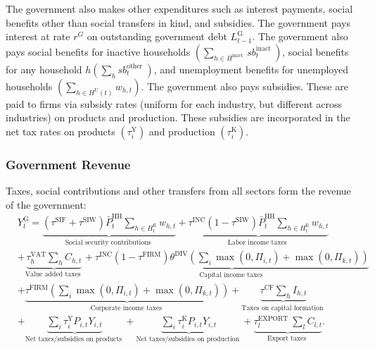 The government also makes other expenditures such as interest payments, social benefits other than social transfers in kind, and subsidies. The government pays interest at rate $r^G$ on outstanding government debt $L^{\mathrm{G}}_{t-1}$. The government also pays social benefits for inactive households $\left(\sum_{h \in H^{\text {inact }}} s b^{\text {inact }}_t\right)$, social benefits for any household $h\left(\sum_h s b^{\text {other }}_t\right)$, and unemployment benefits for unemployed households $\left(\sum_{h \in H^{\mathrm{U}}(t)} w_{h,t}\right)$. The government also pays subsidies. These are paid to firms via subsidy rates (uniform for each industry, but different across industries) on products and production. These subsidies are incorporated in the net tax rates on products $\left(\tau_i^{\mathrm{Y}}\right)$ and production $\left(\tau_i^{\mathrm{K}}\right)$.
\subsubsection{Government Revenue}
Taxes, social contributions and other transfers from all sectors form the revenue of the government:
\begin{equation}
\begin{aligned}
& Y^{\mathrm{G}}_t=\underbrace{\left(\tau^{\mathrm{SIF}}+\tau^{\mathrm{SIW}}\right) \bar{P}^{\mathrm{HH}}_t\sum_{h \in H^{\mathrm{E}}_t} w_{h,t}}_{\text {Social security contributions }}+\underbrace{\tau^{\mathrm{INC}}\left(1-\tau^{\mathrm{SIW}}\right) \bar{P}^{\mathrm{HH}}_t \sum_{h \in H^{\mathrm{E}}_t} w_{h,t}}_{\text {Labor income taxes }} \\
& +\underbrace{\tau_h^{\mathrm{VAT}} \sum_h C_{h,t}}_{\text {Value added taxes }}+\underbrace{\tau^{\mathrm{INC}}\left(1-\tau^{\mathrm{FIRM}}\right) \theta^{\mathrm{DIV}}\left(\sum_i \max \left(0, \Pi_{i,t}\right)+\max \left(0, \Pi_{k,t}\right)\right)}_{\text {Capital income taxes }} \\
& +\underbrace{\tau^{\mathrm{FIRM}}\left(\sum_i \max \left(0, \Pi_{i,t}\right)+\max \left(0, \Pi_{k,t}\right)\right)}_{\text {Corporate income taxes }}+\underbrace{\tau^{\mathrm{CF}} \sum_h I_{h,t}}_{\text {Taxes on capital formation }} \\
& +\underbrace{\sum_i \tau_i^{\mathrm{Y}} P_{i,t} Y_{i,t}}_{\text {Net taxes/subsidies on products }}+\underbrace{\sum_i \tau_i^{\mathrm{K}} P_{i,t} Y_{i,t}}_{\text {Net taxes/subsidies on production }}+\underbrace{\tau_l^{\text {EXPORT }} \sum_l C_{l,t}}_{\text {Export taxes }} . \\
&
\end{aligned}
\end{equation}
